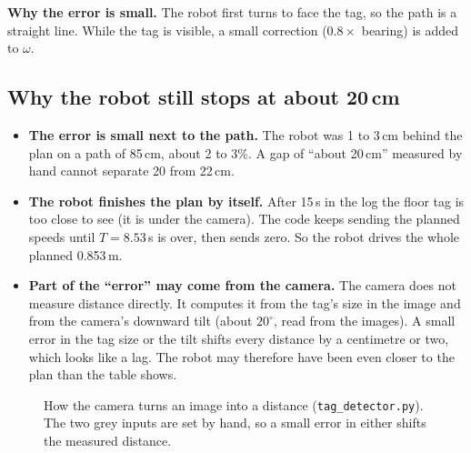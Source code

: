 \documentclass[11pt,a4paper]{article}
\begin{document}
\textbf{Why the error is small.} The robot first turns to face the tag, so the path is a straight line. While the tag is visible, a small correction ($0.8\times$ bearing) is added to $\omega$.

\subsection*{Why the robot still stops at about 20\,cm}
\begin{itemize}
  \item \textbf{The error is small next to the path.} The robot was 1 to 3\,cm behind the plan on a path of 85\,cm, about 2 to 3\%. A gap of ``about 20\,cm'' measured by hand cannot separate 20 from 22\,cm.
  \item \textbf{The robot finishes the plan by itself.} After 15\,s in the log the floor tag is too close to see (it is under the camera). The code keeps sending the planned speeds until $T=8.53$\,s is over, then sends zero. So the robot drives the whole planned 0.853\,m.
  \item \textbf{Part of the ``error'' may come from the camera.} The camera does not measure distance directly. It computes it from the tag's size in the image and from the camera's downward tilt (about $20^\circ$, read from the images). A small error in the tag size or the tilt shifts every distance by a centimetre or two, which looks like a lag. The robot may therefore have been even closer to the plan than the table shows.
\end{itemize}
\begin{figure}[H]\centering
{}
\caption{How the camera turns an image into a distance (\texttt{tag\_detector.py}). The two grey inputs are set by hand, so a small error in either shifts the measured distance.}
\end{figure}
\end{document}
